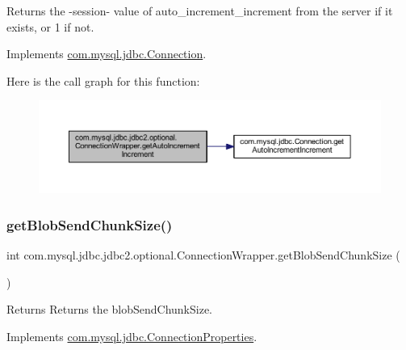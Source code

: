 Returns the -\/session-\/ value of \textquotesingle{}auto\+\_\+increment\+\_\+increment\textquotesingle{} from the server if it exists, or \textquotesingle{}1\textquotesingle{} if not. 

Implements \mbox{\hyperlink{interfacecom_1_1mysql_1_1jdbc_1_1_connection_ab681fd9ce4ce7b52529c0bea9134fc7c}{com.\+mysql.\+jdbc.\+Connection}}.

Here is the call graph for this function\+:
\nopagebreak
\begin{figure}[H]
\begin{center}
\leavevmode
\includegraphics[width=350pt]{classcom_1_1mysql_1_1jdbc_1_1jdbc2_1_1optional_1_1_connection_wrapper_aabd8b0c60542e830e0fccfc8ed0ab005_cgraph}
\end{center}
\end{figure}
\mbox{\label{classcom_1_1mysql_1_1jdbc_1_1jdbc2_1_1optional_1_1_connection_wrapper_a467921d50234ef25af6c18ebfa842db6}} 
\subsubsection{\texorpdfstring{get\+Blob\+Send\+Chunk\+Size()}{getBlobSendChunkSize()}}
{\footnotesize\ttfamily int com.\+mysql.\+jdbc.\+jdbc2.\+optional.\+Connection\+Wrapper.\+get\+Blob\+Send\+Chunk\+Size (\begin{DoxyParamCaption}{ }\end{DoxyParamCaption})}

\begin{DoxyReturn}{Returns}
Returns the blob\+Send\+Chunk\+Size. 
\end{DoxyReturn}


Implements \mbox{\hyperlink{interfacecom_1_1mysql_1_1jdbc_1_1_connection_properties_a722ef2a90bea1ca220340a055850527f}{com.\+mysql.\+jdbc.\+Connection\+Properties}}.

